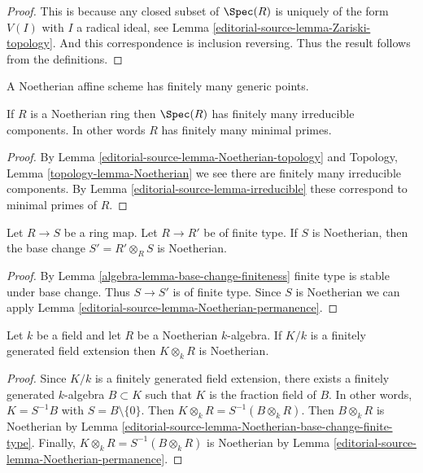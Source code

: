 \begin{proof}
This is because any closed subset of $\Spec(R)$
is uniquely of the form $V(I)$ with $I$ a radical ideal,
see Lemma \ref{editorial-source-lemma-Zariski-topology}.
And this correspondence is inclusion reversing.
Thus the result follows from the definitions.
\end{proof}

\begin{lemma}
\label{editorial-source-lemma-Noetherian-irreducible-components}
\begin{slogan}
A Noetherian affine scheme has finitely many generic points.
\end{slogan}
If $R$ is a Noetherian ring then $\Spec(R)$
has finitely many irreducible components. In other words
$R$ has finitely many minimal primes.
\end{lemma}

\begin{proof}
By Lemma \ref{editorial-source-lemma-Noetherian-topology} and
Topology, Lemma \ref{topology-lemma-Noetherian}
we see there are finitely many irreducible components.
By Lemma \ref{editorial-source-lemma-irreducible} these correspond to
minimal primes of $R$.
\end{proof}

\begin{lemma}
\label{editorial-source-lemma-Noetherian-base-change-finite-type}
Let $R \to S$ be a ring map. Let $R \to R'$ be of finite type.
If $S$ is Noetherian, then the base change $S' = R' \otimes_R S$
is Noetherian.
\end{lemma}

\begin{proof}
By Lemma \ref{algebra-lemma-base-change-finiteness} finite type is stable under
base change. Thus $S \to S'$ is of finite type. Since $S$ is Noetherian we
can apply Lemma \ref{editorial-source-lemma-Noetherian-permanence}.
\end{proof}

\begin{lemma}
\label{editorial-source-lemma-Noetherian-field-extension}
Let $k$ be a field and let $R$ be a Noetherian $k$-algebra.
If $K/k$ is a finitely generated field extension then
$K \otimes_k R$ is Noetherian.
\end{lemma}

\begin{proof}
Since $K/k$ is a finitely generated field extension, there exists
a finitely generated $k$-algebra $B \subset K$ such that $K$ is
the fraction field of $B$. In other words, $K = S^{-1}B$
with $S = B \setminus \{0\}$. Then $K \otimes_k R = S^{-1}(B \otimes_k R)$.
Then $B \otimes_k R$ is Noetherian by
Lemma \ref{editorial-source-lemma-Noetherian-base-change-finite-type}.
Finally, $K \otimes_k R = S^{-1}(B \otimes_k R)$ is Noetherian by
Lemma \ref{editorial-source-lemma-Noetherian-permanence}.
\end{proof}

